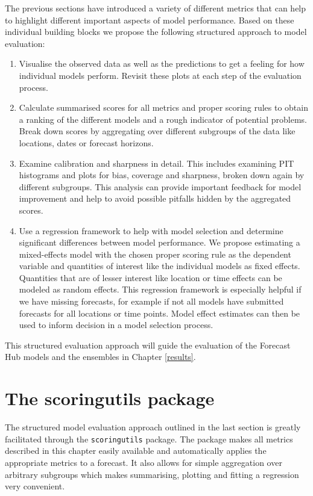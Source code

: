 \documentclass[
]{book}
\providecommand{\tightlist}{%
  \setlength{\itemsep}{0pt}\setlength{\parskip}{0pt}}
\begin{document}
The previous sections have introduced a variety of different metrics that can help to highlight different important aspects of model performance. Based on these individual building blocks we propose the following structured approach to model evaluation:

\begin{enumerate}
\def\labelenumi{\arabic{enumi}.}
\tightlist
\item
  Visualise the observed data as well as the predictions to get a feeling for how individual models perform. Revisit these plots at each step of the evaluation process.
\item
  Calculate summarised scores for all metrics and proper scoring rules to obtain a ranking of the different models and a rough indicator of potential problems. Break down scores by aggregating over different subgroups of the data like locations, dates or forecast horizons.
\item
  Examine calibration and sharpness in detail. This includes examining PIT histograms and plots for bias, coverage and sharpness, broken down again by different subgroups. This analysis can provide important feedback for model improvement and help to avoid possible pitfalls hidden by the aggregated scores.
\item
  Use a regression framework to help with model selection and determine significant differences between model performance. We propose estimating a mixed-effects model with the chosen proper scoring rule as the dependent variable and quantities of interest like the individual models as fixed effects. Quantities that are of lesser interest like location or time effects can be modeled as random effects. This regression framework is especially helpful if we have missing forecasts, for example if not all models have submitted forecasts for all locations or time points. Model effect estimates can then be used to inform decision in a model selection process.
\end{enumerate}

This structured evaluation approach will guide the evaluation of the Forecast Hub models and the ensembles in Chapter \ref{results}.

\hypertarget{the-scoringutils-package}{%
\section{The scoringutils package}\label{the-scoringutils-package}}

The structured model evaluation approach outlined in the last section is greatly facilitated through the \texttt{scoringutils} \citep{R-scoringutils} package. The package makes all metrics described in this chapter easily available and automatically applies the appropriate metrics to a forecast. It also allows for simple aggregation over arbitrary subgroups which makes summarising, plotting and fitting a regression very convenient.
\end{document}

